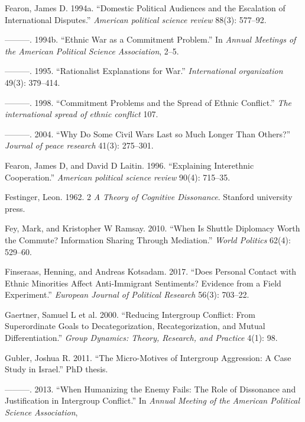 \documentclass[11pt]{article}
\begin{document}
\hypertarget{ref-fearon1994domestic}{}
Fearon, James D. 1994a. ``Domestic Political Audiences and the
Escalation of International Disputes.'' \emph{American political science
review} 88(3): 577--92.

\hypertarget{ref-fearon1994ethnic}{}
---------. 1994b. ``Ethnic War as a Commitment Problem.'' In
\emph{Annual Meetings of the American Political Science Association},
2--5.

\hypertarget{ref-fearon1995rationalist}{}
---------. 1995. ``Rationalist Explanations for War.''
\emph{International organization} 49(3): 379--414.

\hypertarget{ref-fearon1998commitment}{}
---------. 1998. ``Commitment Problems and the Spread of Ethnic
Conflict.'' \emph{The international spread of ethnic conflict} 107.

\hypertarget{ref-fearon2004civil}{}
---------. 2004. ``Why Do Some Civil Wars Last so Much Longer Than
Others?'' \emph{Journal of peace research} 41(3): 275--301.

\hypertarget{ref-fearon1996explaining}{}
Fearon, James D, and David D Laitin. 1996. ``Explaining Interethnic
Cooperation.'' \emph{American political science review} 90(4): 715--35.

\hypertarget{ref-festinger1962cognitiveDissonance}{}
Festinger, Leon. 1962. 2 \emph{A Theory of Cognitive Dissonance}.
Stanford university press.

\hypertarget{ref-fey2010shuttle}{}
Fey, Mark, and Kristopher W Ramsay. 2010. ``When Is Shuttle Diplomacy
Worth the Commute? Information Sharing Through Mediation.'' \emph{World
Politics} 62(4): 529--60.

\hypertarget{ref-finseraas2017does}{}
Finseraas, Henning, and Andreas Kotsadam. 2017. ``Does Personal Contact
with Ethnic Minorities Affect Anti-Immigrant Sentiments? Evidence from a
Field Experiment.'' \emph{European Journal of Political Research} 56(3):
703--22.

\hypertarget{ref-gaertner2000reducing}{}
Gaertner, Samuel L et al. 2000. ``Reducing Intergroup Conflict: From
Superordinate Goals to Decategorization, Recategorization, and Mutual
Differentiation.'' \emph{Group Dynamics: Theory, Research, and Practice}
4(1): 98.

\hypertarget{ref-gubler2011diss}{}
Gubler, Joshua R. 2011. ``The Micro-Motives of Intergroup Aggression: A
Case Study in Israel.'' PhD thesis.

\hypertarget{ref-gubler2013humanizing}{}
---------. 2013. ``When Humanizing the Enemy Fails: The Role of
Dissonance and Justification in Intergroup Conflict.'' In \emph{Annual
Meeting of the American Political Science Association},
\end{document}
